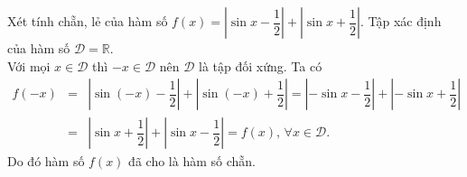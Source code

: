 \begin{bt}%
	Xét tính chẵn, lẻ của hàm số $f(x)=\left|\sin x-\dfrac{1}{2}\right|+\left|\sin x+\dfrac{1}{2}\right|$.
	\loigiai
	{
		Tập xác định của hàm số $\mathscr{D}=\mathbb{R}$.\\
		Với mọi $x\in\mathscr{D}$ thì $-x\in\mathscr{D}$ nên $\mathscr{D}$ là tập đối xứng. Ta có
		\allowdisplaybreaks
		\begin{eqnarray*}
			f(-x)&=&\left|\sin (-x)-\dfrac{1}{2}\right|+\left|\sin (-x)+\dfrac{1}{2}\right|=\left|-\sin x-\dfrac{1}{2}\right|+\left|-\sin x+\dfrac{1}{2}\right|\\
			&=&\left|\sin x+\dfrac{1}{2}\right|+\left|\sin x-\dfrac{1}{2}\right|=f(x),\,\forall x\in\mathscr{D}.
		\end{eqnarray*}
		Do đó hàm số $f(x)$ đã cho là hàm số chẵn.
	}
\end{bt}
